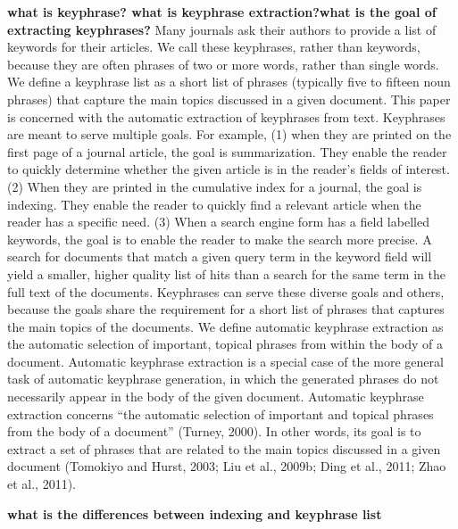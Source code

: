 \textbf{what is keyphrase? what is keyphrase extraction?what is the goal of extracting keyphrases?}
Many journals ask their authors to provide a list of keywords for their articles. We call these keyphrases, rather than keywords, because they are often phrases of two or more words, rather than single words. We define a keyphrase list as a short list of phrases (typically five to fifteen noun phrases) that capture the main topics discussed in a given document. This paper is concerned with the automatic extraction of keyphrases from text.
Keyphrases are meant to serve multiple goals. For example, (1) when they are printed on the first page of a journal article, the goal is summarization. They enable the reader to quickly determine whether the given article is in the reader’s fields of interest. (2) When they are printed in the cumulative index for a journal, the goal is indexing. They enable the reader to quickly find a relevant article when the reader has a specific need. (3) When a search engine form has a field labelled keywords, the goal is to enable the reader to make the search more precise. A search for documents that match a given query term in the keyword field will yield a smaller, higher quality list of hits than a search for the same term in the full text of the documents. Keyphrases can serve these diverse goals and others, because the goals share the requirement for a short list of phrases that captures the main topics of the documents.
We define automatic keyphrase extraction as the automatic selection of important, topical phrases from within the body of a document. Automatic keyphrase extraction is a special case of the more general task of automatic keyphrase generation, in which the generated phrases do not necessarily appear in the body of the given document.\newline\newline\newline
 Automatic keyphrase extraction concerns “the automatic selection of important and topical phrases from the body of a document” (Turney, 2000). In other words, its goal is to extract a set of phrases that are related to the main topics discussed in a given document (Tomokiyo and Hurst, 2003; Liu et al., 2009b; Ding et al., 2011; Zhao et al., 2011).\cite{KeyphraseSurvey}
\newline

 
\textbf{what is the differences between indexing and keyphrase list}

